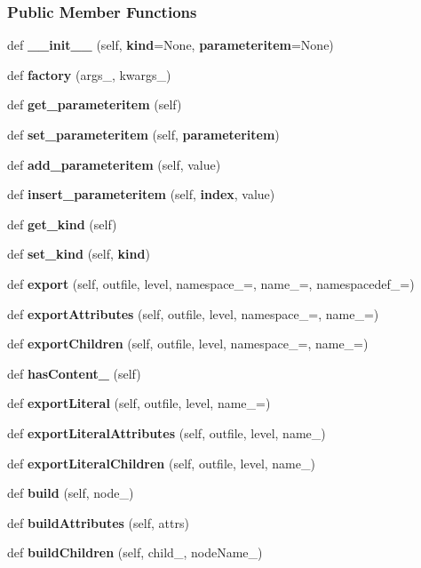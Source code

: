 \subsubsection*{Public Member Functions}
\begin{DoxyCompactItemize}
\item 
def {\bf \+\_\+\+\_\+init\+\_\+\+\_\+} (self, {\bf kind}=None, {\bf parameteritem}=None)
\item 
def {\bf factory} (args\+\_\+, kwargs\+\_\+)
\item 
def {\bf get\+\_\+parameteritem} (self)
\item 
def {\bf set\+\_\+parameteritem} (self, {\bf parameteritem})
\item 
def {\bf add\+\_\+parameteritem} (self, value)
\item 
def {\bf insert\+\_\+parameteritem} (self, {\bf index}, value)
\item 
def {\bf get\+\_\+kind} (self)
\item 
def {\bf set\+\_\+kind} (self, {\bf kind})
\item 
def {\bf export} (self, outfile, level, namespace\+\_\+=\textquotesingle{}\textquotesingle{}, name\+\_\+=\textquotesingle{}, namespacedef\+\_\+=\textquotesingle{}\textquotesingle{})
\item 
def {\bf export\+Attributes} (self, outfile, level, namespace\+\_\+=\textquotesingle{}\textquotesingle{}, name\+\_\+=\textquotesingle{})
\item 
def {\bf export\+Children} (self, outfile, level, namespace\+\_\+=\textquotesingle{}\textquotesingle{}, name\+\_\+=\textquotesingle{})
\item 
def {\bf has\+Content\+\_\+} (self)
\item 
def {\bf export\+Literal} (self, outfile, level, name\+\_\+=\textquotesingle{})
\item 
def {\bf export\+Literal\+Attributes} (self, outfile, level, name\+\_\+)
\item 
def {\bf export\+Literal\+Children} (self, outfile, level, name\+\_\+)
\item 
def {\bf build} (self, node\+\_\+)
\item 
def {\bf build\+Attributes} (self, attrs)
\item 
def {\bf build\+Children} (self, child\+\_\+, node\+Name\+\_\+)
\end{DoxyCompactItemize}
